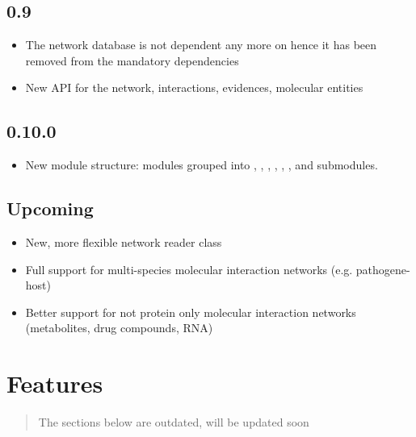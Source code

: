 \documentclass[letterpaper,10pt,english]{sphinxmanual}
\begin{document}
\section{0.9}
\label{\detokenize{index:id15}}\begin{itemize}
\item {} 
The network database is not dependent any more on  hence it
has been removed from the mandatory dependencies

\item {} 
New API for the network, interactions, evidences, molecular entities

\end{itemize}


\section{0.10.0}
\label{\detokenize{index:id16}}\begin{itemize}
\item {} 
New module structure: modules grouped into , , ,
, , ,  and  submodules.

\end{itemize}


\section{Upcoming}
\label{\detokenize{index:upcoming}}\begin{itemize}
\item {} 
New, more flexible network reader class

\item {} 
Full support for multi-species molecular interaction networks
(e.g. pathogene-host)

\item {} 
Better support for not protein only molecular interaction networks
(metabolites, drug compounds, RNA)

\end{itemize}


\chapter{Features}
\label{\detokenize{index:features}}\begin{quote}

The sections below are outdated, will be updated soon
\end{quote}
\end{document}
